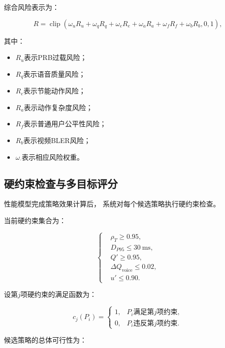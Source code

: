 \documentclass[lang=cn,12pt]{elegantbook}
\begin{document}
综合风险表示为：

\begin{equation}
R
=
\operatorname{clip}
\left(
\omega_uR_u
+
\omega_qR_q
+
\omega_eR_e
+
\omega_aR_a
+
\omega_fR_f
+
\omega_bR_b,
0,
1
\right),
\label{eq:total_risk_reduced}
\end{equation}

其中：

\begin{itemize}
    \item $R_u$表示PRB过载风险；
    \item $R_q$表示语音质量风险；
    \item $R_e$表示节能动作风险；
    \item $R_a$表示动作复杂度风险；
    \item $R_f$表示普通用户公平性风险；
    \item $R_b$表示视频BLER风险；
    \item $\omega_{\cdot}$表示相应风险权重。
\end{itemize}


\subsection*{硬约束检查与多目标评分}

性能模型完成策略效果计算后，
系统对每个候选策略执行硬约束检查。

当前硬约束集合为：

\begin{equation}
\left\{
\begin{aligned}
&\rho_T\geq0.95,\\
&D_{P95}\leq30~\mathrm{ms},\\
&Q'\geq0.95,\\
&\Delta Q_{\mathrm{voice}}\leq0.02,\\
&u'\leq0.90.
\end{aligned}
\right.
\label{eq:hard_constraints_reduced}
\end{equation}

设第$j$项硬约束的满足函数为：

\begin{equation}
c_j(P_i)
=
\begin{cases}
1,
& P_i\text{满足第$j$项约束},\\
0,
& P_i\text{违反第$j$项约束}.
\end{cases}
\label{eq:constraint_indicator_reduced}
\end{equation}

候选策略的总体可行性为：
\end{document}
